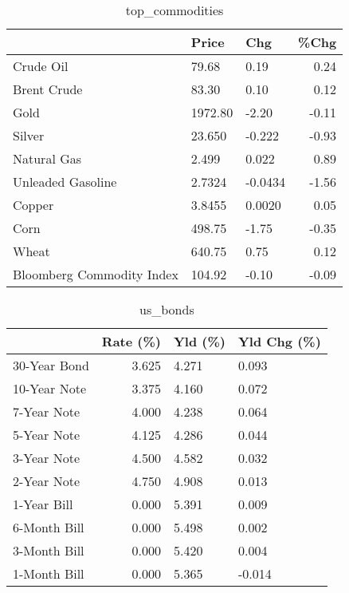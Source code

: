 \documentclass{article}%
\begin{document}
\begin{table}[htbp]%
\caption{top\_commodities}%
\centering%
\begin{adjustbox}{width=1\textwidth}%
\begin{tabular}{lllr}
\toprule
                          &   Price &     Chg &  \%Chg \\
\midrule
               Crude Oil  &   79.68 &    0.19 &  0.24 \\
             Brent Crude  &   83.30 &    0.10 &  0.12 \\
                    Gold  & 1972.80 &   -2.20 & -0.11 \\
                  Silver  &  23.650 &  -0.222 & -0.93 \\
             Natural Gas  &   2.499 &   0.022 &  0.89 \\
       Unleaded Gasoline  &  2.7324 & -0.0434 & -1.56 \\
                  Copper  &  3.8455 &  0.0020 &  0.05 \\
                    Corn  &  498.75 &   -1.75 & -0.35 \\
                   Wheat  &  640.75 &    0.75 &  0.12 \\
Bloomberg Commodity Index &  104.92 &   -0.10 & -0.09 \\
\bottomrule
\end{tabular}
%
\end{adjustbox}%
\end{table}

%


\begin{table}[htbp]%
\caption{us\_bonds}%
\centering%
\begin{adjustbox}{width=1\textwidth}%
\begin{tabular}{lrll}
\toprule
             &  Rate (\%) & Yld (\%) & Yld Chg (\%) \\
\midrule
30-Year Bond &     3.625 &   4.271 &       0.093 \\
10-Year Note &     3.375 &   4.160 &       0.072 \\
 7-Year Note &     4.000 &   4.238 &       0.064 \\
 5-Year Note &     4.125 &   4.286 &       0.044 \\
 3-Year Note &     4.500 &   4.582 &       0.032 \\
 2-Year Note &     4.750 &   4.908 &       0.013 \\
 1-Year Bill &     0.000 &   5.391 &       0.009 \\
6-Month Bill &     0.000 &   5.498 &       0.002 \\
3-Month Bill &     0.000 &   5.420 &       0.004 \\
1-Month Bill &     0.000 &   5.365 &      -0.014 \\
\bottomrule
\end{tabular}
%
\end{adjustbox}%
\end{table}
\end{document}
